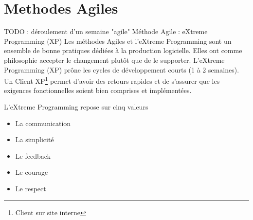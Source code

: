 \chapter{Methodes Agiles}
TODO : déroulement d'un semaine "agile"
Méthode Agile : eXtreme Programming  (XP)
Les méthodes Agiles et l'eXtreme Programming sont un ensemble de bonne pratiques dédiées à la production logicielle. Elles ont comme philosophie accepter le changement plutôt que de le supporter. L'eXtreme Programming (XP) prône les cycles de développement courts (1 à 2 semaines). Un Client XP\footnote{Client sur site interne} permet d'avoir des retours rapides et de s'assurer que les exigences fonctionnelles soient bien comprises et implémentées.

L'eXtreme Programming repose sur cinq valeurs
\begin{itemize}
\item{La communication}
\item{La simplicité}
\item{Le feedback}
\item{Le courage}
\item{Le respect}
\end{itemize}
